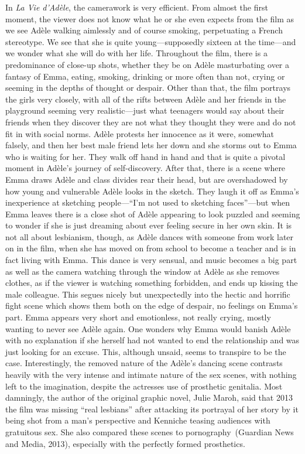 \documentclass[12pt,a4paper]{article}
\begin{document}
In \textit{La Vie d'Adèle}, the camerawork is very efficient. From
almost the first moment, the viewer does not know what he or she even
expects from the film as we see Adèle walking aimlessly and of course
smoking, perpetuating a French stereotype. We see that she is quite
young---supposedly sixteen at the time---and we wonder what she will
do with her life. Throughout the film, there is a predominance of
close-up shots, whether they be on Adèle masturbating over a fantasy
of Emma, eating, smoking, drinking or more often than not, crying or
seeming in the depths of thought or despair. Other than that, the film
portrays the girls very closely, with all of the rifts between Adèle
and her friends in the playground seeming very realistic---just what
teenagers would say about their friends when they discover they are
not what they thought they were and do not fit in with social norms.
Adèle protests her innocence as it were, somewhat falsely, and then
her best male friend lets her down and she storms out to Emma who is
waiting for her. They walk off hand in hand and that is quite a
pivotal moment in Adèle's journey of self-discovery. After that, there
is a scene where Emma draws Adèle and class divides rear their head,
but are overshadowed by how young and vulnerable Adèle looks in the
sketch. They laugh it off as Emma's inexperience at sketching
people---``I'm not used to sketching faces''---but when Emma leaves
there is a close shot of Adèle appearing to look puzzled and seeming
to wonder if she is just dreaming about ever feeling secure in her own
skin. It is not all about lesbianism, though, as Adèle dances with
someone from work later on in the film, when she has moved on from
school to become a teacher and is in fact living with Emma. This dance
is very sensual, and music becomes a big part as well as the camera
watching through the window at Adèle as she removes clothes, as if the
viewer is watching something forbidden, and ends up kissing the male
colleague. This segues nicely but unexpectedly into the hectic and
horrific fight scene which shows them both on the edge of despair, no
feelings on Emma's part. Emma appears very short and emotionless, not
really crying, mostly wanting to never see Adèle again. One wonders
why Emma would banish Adèle with no explanation if she herself had not
wanted to end the relationship and was just looking for an excuse.
This, although unsaid, seems to transpire to be the case.
Interestingly, the removed nature of the Adèle's dancing scene
contrasts heavily with the very intense and intimate nature of the sex
scenes, with nothing left to the imagination, despite the actresses
use of prosthetic genitalia. Most damningly, the author of the
original graphic novel, Julie Maroh, said that 2013 the film was
missing ``real lesbians'' after attacking its portrayal of her story
by it being shot from a man's perspective and Kenniche teasing
audiences with gratuitous sex. She also compared these scenes to
pornography~(Guardian News and Media, 2013\nocite{author-interview}),
especially with the perfectly formed prosthetics.\\
\end{document}
